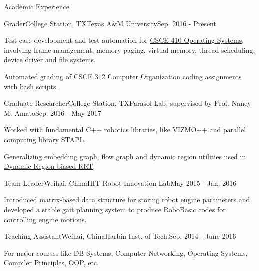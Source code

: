 \documentclass{resume} %
\begin{document}
\begin{rSection}{Academic Experience}
\begin{rSubsection}{Grader}{College Station, TX}{Texas A\&M University}{Sep. 2016 - Present}
\item Test case development and test automation for \href{http://faculty.cse.tamu.edu/dilma/web-csce410-fall16/index.htm}{CSCE 410 Operating Systems}, involving frame management, memory paging, virtual memory, thread scheduling, device driver and file systems.
\item Automated grading of \href{http://faculty.cse.tamu.edu/djimenez/312/}{CSCE 312 Computer Organization} coding assignments with \href{https://github.com/tamu-csce312/hw-test}{bash scripts}.
\end{rSubsection}

\begin{rSubsection}{Graduate Researcher}{College Station, TX}{Parasol Lab, supervised by Prof. Nancy M. Amato}{Sep. 2016 - May 2017}
\item Worked with fundamental C++ robotics libraries, like \href{https://parasol.tamu.edu/groups/amatogroup/research/UserGuided/Old/vizmo++/}{VIZMO++} and parallel computing library \href{https://parasol.tamu.edu/groups/rwergergroup/research/stapl/}{STAPL}.
\item Generalizing embedding graph, flow graph and dynamic region utilities used in \href{http://wafr2016.berkeley.edu/papers/WAFR_2016_paper_36.pdf}{Dynamic Region-biased RRT}.
\end{rSubsection}

\begin{rSubsection}{Team Leader}{Weihai, China}{HIT Robot Innovation Lab}{May 2015 - Jan. 2016}
\item Introduced matrix-based data structure for storing robot engine parameters and developed a stable gait planning system to produce RoboBasic codes for controlling engine motions.
\end{rSubsection}

\begin{rSubsection}{Teaching Assistant}{Weihai, China}{Harbin Inst. of Tech.}{Sep. 2014 - June 2016}
\item For major courses like DB Systems, Computer Networking, Operating Systems, Compiler Principles, OOP, etc.
\end{rSubsection}
\end{rSection}
\end{document}
